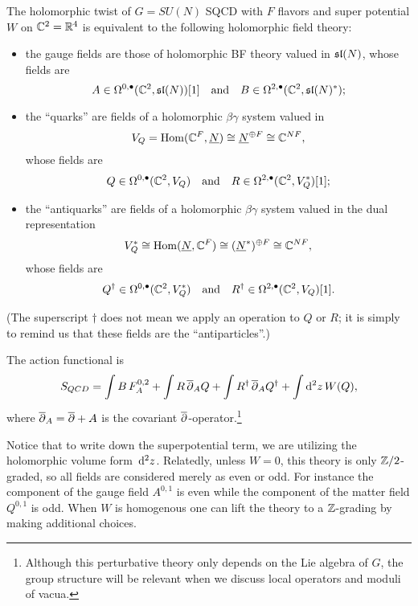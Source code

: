 \documentclass[11pt]{amsart}
\def\C{{\mathbb{C}}}
\begin{document}
\begin{thm}
The holomorphic twist of $G = SU(N)$ SQCD with $F$ flavors and super potential $W$ on $\C^2 = \RR^4$ is equivalent to the following holomorphic field theory:
\begin{itemize}
\item the gauge fields are those of holomorphic BF theory valued in $\sl(N)$, whose fields are
\[
A \in \Omega^{0,\bu}(\CC^2 , \sl(N))[1] \quad\text{and}\quad B \in \Omega^{2,\bu}(\CC^2, \sl(N)^*);
\]
\item the ``quarks'' are fields of a holomorphic $\beta\gamma$ system valued in 
\[
V_Q = \Hom(\CC^F, \underline{N}) \cong \underline{N}^{\oplus F} \cong \CC^{NF},
\] 
whose fields are
\[
Q \in \Omega^{0,\bu}(\CC^2 , V_Q) \quad\text{and}\quad R \in \Omega^{2,\bu}(\CC^2 , V_Q^*)[1];
\]
\item the ``antiquarks'' are fields of a holomorphic $\beta\gamma$ system valued in the dual representation 
\[
V^*_Q \cong \Hom(\underline{N}, \CC^F) \cong (\underline{N}^*)^{\oplus F} \cong \CC^{NF}, 
\]
whose fields are
\[
Q^\dag \in \Omega^{0,\bu}(\CC^2 , V^*_Q) \quad\text{and}\quad R^\dag \in \Omega^{2,\bu}(\CC^2 , V_Q) [1].
\]
\end{itemize}
(The superscript $\dag$ does not mean we apply an operation to $Q$ or $R$; 
it is simply to remind us that these fields are the ``antiparticles''.)

The action functional is
\[
S_{QCD} = \int B\, F^{0,2}_A + \int R \,\dbar_A Q + \int R^\dag \,\dbar_A Q^\dag + \int\d^2 z \, W(Q) ,
\]
where $\dbar_A = \dbar + A$ is the covariant $\dbar$-operator.\footnote{Although this perturbative theory only depends on the Lie algebra of $G$, the group structure will be relevant when we discuss local operators and moduli of vacua.}
\end{thm}



\begin{rmk}
Notice that to write down the superpotential term, we are utilizing the holomorphic volume form~$\d^2 z$. 
Relatedly, unless $W = 0$, this theory is only $\ZZ/2$-graded, so all fields are considered merely as even or odd.
For instance the component of the gauge field $A^{0,1}$ is even while the component of the matter field $Q^{0,1}$ is odd. 
When $W$ is homogenous one can lift the theory to a $\ZZ$-grading by making additional choices.
\end{rmk}
\end{document}
